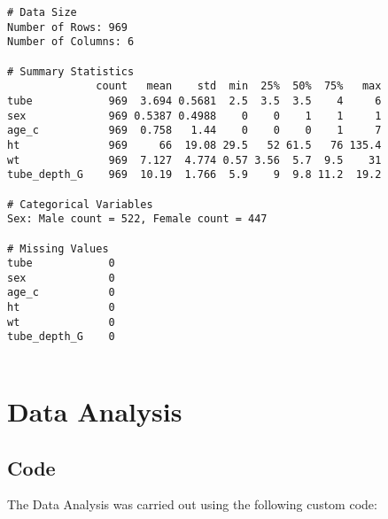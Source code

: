 \documentclass[11pt]{article}
\begin{document}
\begin{Verbatim}[tabsize=4]
# Data Size
Number of Rows: 969
Number of Columns: 6

# Summary Statistics
              count   mean    std  min  25%  50%  75%   max
tube            969  3.694 0.5681  2.5  3.5  3.5    4     6
sex             969 0.5387 0.4988    0    0    1    1     1
age_c           969  0.758   1.44    0    0    0    1     7
ht              969     66  19.08 29.5   52 61.5   76 135.4
wt              969  7.127  4.774 0.57 3.56  5.7  9.5    31
tube_depth_G    969  10.19  1.766  5.9    9  9.8 11.2  19.2

# Categorical Variables
Sex: Male count = 522, Female count = 447

# Missing Values
tube            0
sex             0
age_c           0
ht              0
wt              0
tube_depth_G    0


\end{Verbatim}

\section{Data Analysis}
\subsection{{Code}}
The Data Analysis was carried out using the following custom code:
\end{document}
